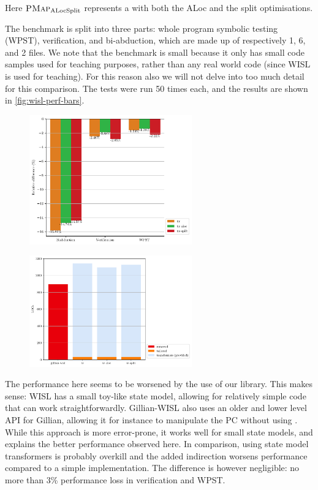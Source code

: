 Here $\textsc{PMap}_{\text{ALocSplit}}$ represents a \PMap{} with both the ALoc and the split optimisations.

The benchmark is split into three parts: whole program symbolic testing (WPST), verification, and bi-abduction, which are made up of respectively 1, 6, and 2 files. We note that the benchmark is small because it only has small code samples used for teaching purposes, rather than any real world code (since WISL is used for teaching). For this reason also we will not delve into too much detail for this comparison. The tests were run 50 times each, and the results are shown in \autoref{fig:wisl-perf-bars}.

\begin{figure}
\captionsetup{width=.4\linewidth}
\centering
\begin{minipage}[t]{.45\textwidth}
	\centering
	\includegraphics[width=7cm]{figures/wisl/avg_mode_relative_diff.pdf}
	\label{fig:wisl-perf-bars}
\end{minipage}\hfill%
\begin{minipage}[t]{.45\textwidth}
	\centering
	\includegraphics[width=7cm]{figures/wisl/locs.pdf}
	\label{fig:wisl-locs}
\end{minipage}%
\end{figure}

The performance here seems to be worsened by the use of our library. This makes sense: WISL has a small toy-like state model, allowing for relatively simple code that can work straightforwardly. Gillian-WISL also uses an older and lower level API for Gillian, allowing it for instance to manipulate the PC without using . While this approach is more error-prone, it works well for small state models, and explains the better performance observed here. In comparison, using state model transformers is probably overkill and the added indirection worsens performance compared to a simple implementation. The difference is however negligible: no more than 3\% performance loss in verification and WPST.

